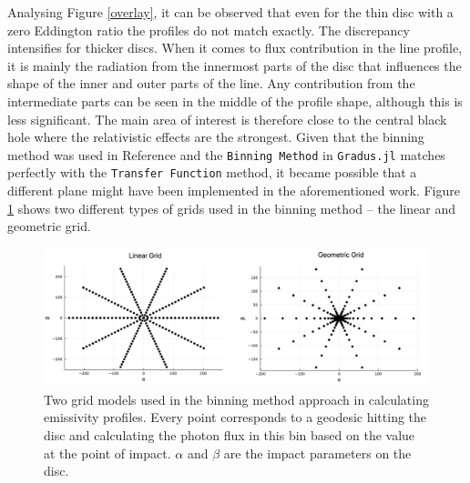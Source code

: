 \documentclass[fleqn,usenatbib,useAMS]{mnras}
\begin{document}
Analysing Figure \ref{overlay}, it can be observed that even for the thin disc with a zero Eddington ratio the profiles do not match exactly. The discrepancy intensifies for thicker discs. When it comes to flux contribution in the line profile, it is mainly the radiation from the innermost parts of the disc that influences the shape of the inner and outer parts of the line. Any contribution from the intermediate parts can be seen in the middle of the profile shape, although this is less significant. The main area of interest is therefore close to the central black hole where the relativistic effects are the strongest. Given that the binning method was used in Reference \cite{taylor2018exploring} and the {\tt Binning Method} in {\tt Gradus.jl} matches perfectly with the {\tt Transfer Function} method, it became possible that a different plane might have been implemented in the aforementioned work. Figure \ref{grid} shows two different types of grids used in the binning method -- the linear and geometric grid.

\begin{figure}[!h]
    \centering
    \includegraphics[width=0.98\linewidth]{figures/grid.png}
    \caption{Two grid models used in the binning method approach in calculating emissivity profiles. Every point corresponds to a geodesic hitting the disc and calculating the photon flux in this bin based on the value at the point of impact. $\alpha$ and $\beta$ are the impact parameters on the disc.}
    \label{grid}
\end{figure}
\end{document}
